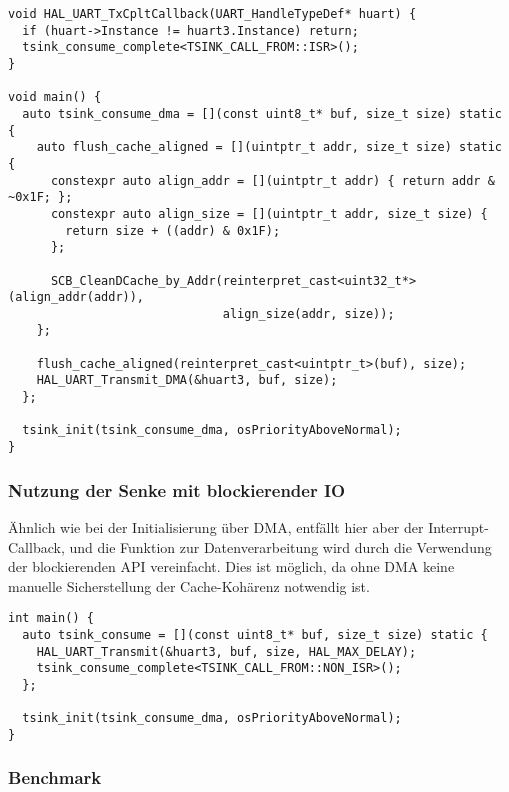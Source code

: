 \begin{code}
\begin{verbatim}
void HAL_UART_TxCpltCallback(UART_HandleTypeDef* huart) {
  if (huart->Instance != huart3.Instance) return;
  tsink_consume_complete<TSINK_CALL_FROM::ISR>();
}

void main() {
  auto tsink_consume_dma = [](const uint8_t* buf, size_t size) static {
    auto flush_cache_aligned = [](uintptr_t addr, size_t size) static {
      constexpr auto align_addr = [](uintptr_t addr) { return addr & ~0x1F; };
      constexpr auto align_size = [](uintptr_t addr, size_t size) {
        return size + ((addr) & 0x1F);
      };

      SCB_CleanDCache_by_Addr(reinterpret_cast<uint32_t*>(align_addr(addr)),
                              align_size(addr, size));
    };

    flush_cache_aligned(reinterpret_cast<uintptr_t>(buf), size);
    HAL_UART_Transmit_DMA(&huart3, buf, size);
  };

  tsink_init(tsink_consume_dma, osPriorityAboveNormal);
}
\end{verbatim}
\end{code}

\subsubsection{Nutzung der Senke mit blockierender IO}

Ähnlich wie bei der Initialisierung über DMA, entfällt hier aber der
Interrupt-Callback, und die Funktion zur Datenverarbeitung wird durch die
Verwendung der blockierenden API vereinfacht. Dies ist möglich, da ohne DMA
keine manuelle Sicherstellung der Cache-Kohärenz notwendig ist.

\begin{code}
\begin{verbatim}
int main() {
  auto tsink_consume = [](const uint8_t* buf, size_t size) static {
    HAL_UART_Transmit(&huart3, buf, size, HAL_MAX_DELAY);
    tsink_consume_complete<TSINK_CALL_FROM::NON_ISR>();
  };

  tsink_init(tsink_consume_dma, osPriorityAboveNormal);
}
\end{verbatim}
\end{code}

\subsubsection{Benchmark}

